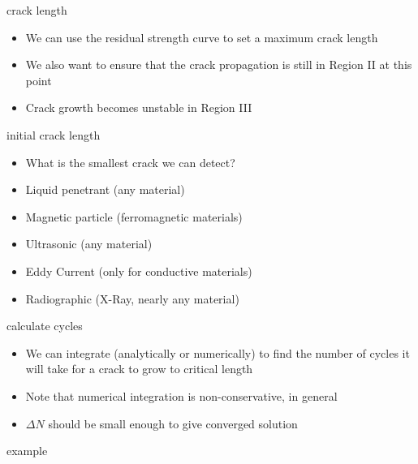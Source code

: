 \documentclass[10pt]{beamer}
\begin{document}
	\begin{frame}{crack length}
		\begin{itemize}[<+->]
			\item We can use the residual strength curve to set a maximum crack length
			\item We also want to ensure that the crack propagation is still in Region II at this point
			\item Crack growth becomes unstable in Region III
		\end{itemize}
	\end{frame}
	
	\begin{frame}{initial crack length}
		\begin{itemize}[<+->]
			\item What is the smallest crack we can detect?
			\item Liquid penetrant (any material)
			\item Magnetic particle (ferromagnetic materials)
			\item Ultrasonic (any material)
			\item Eddy Current (only for conductive materials)
			\item Radiographic (X-Ray, nearly any material)
		\end{itemize}
	\end{frame}
	
	\begin{frame}{calculate cycles}
		\begin{itemize}[<+->]
			\item We can integrate (analytically or numerically) to find the number of cycles it will take for a crack to grow to critical length
			\item Note that numerical integration is non-conservative, in general
			\item $\Delta N$ should be small enough to give converged solution
		\end{itemize}
	\end{frame}
	
	\begin{frame}{example}
		
	\end{frame}
\end{document}
